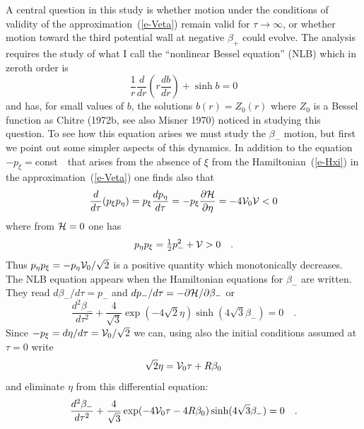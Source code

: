 A central question in this study is whether motion under the
conditions of validity of the approximation~(\ref{e-Veta}) remain
valid for $\tau \rightarrow \infty$, or whether motion toward the
third potential wall at negative $\beta_+$ could evolve.  The
analysis requires the study of what I call the ``nonlinear Bessel
equation'' (NLB) which in zeroth order is
\begin{equation}\label{e-NLB}
   \frac{1}{r}\frac{d}{dr}\left(r\frac{db}{dr}\right) + \sinh b = 0
\end{equation}
and has, for small values of $b$, the solutions $b(r) = Z_0(r)$ where
$Z_0$ is a Bessel function as Chitre (1972b, see also Misner 1970)
noticed in studying this question.  To see how this equation arises
we must study the $\beta_-$ motion, but first we point out some
simpler aspects of this dynamics. In addition to the equation $-p_\xi
= $const\ \  that arises from the absence of $\xi$ from the
Hamiltonian~(\ref{e-Hxi}) in the approximation~(\ref{e-Veta}) one
finds also that
\begin{equation}
   \frac{d}{d\tau}(p_\xi p_\eta) = p_\xi \frac{dp_\eta}{d\tau}
   = - p_\xi \frac{\partial {\cal H}}{\partial\eta}
   = -4{\cal V}_0 {\cal V} < 0
\end{equation}
where from ${\cal H} = 0$ one has
\begin{equation}
   p_\eta p_\xi = \mbox{$\frac{1}{2}$} p_-^2 + {\cal V} > 0 \quad .
\end{equation}
Thus $p_\eta p_\xi = -p_\eta {\cal V}_0/\sqrt{2}$ is a positive
quantity which monotonically decreases.  The NLB equation appears
when the Hamiltonian equations for $\beta_-$ are written.  They read
$d\beta_-/d\tau = p_-$ and $dp_-/d\tau = -\partial {\cal H}/\partial
\beta_-$ or
\begin{equation}
   \frac{d^2\beta_-}{d\tau^2} + \frac{4}{\sqrt{3}}\exp(-4\sqrt{2}\eta)
                                    \sinh(4\sqrt{3}\beta_-) = 0 \quad .
\end{equation}
Since $-p_\xi = d\eta/d\tau = {\cal V}_0 / \sqrt{2}$ we can, using
also the initial conditions assumed at $\tau = 0$ write
\begin{equation}
   \sqrt{2}\eta = {\cal V}_0 \tau + R\beta_0
\end{equation}
and eliminate $\eta$ from this differential equation:
\begin{equation}
   \frac{d^2\beta_-}{d\tau^2}
            + \frac{4}{\sqrt{3}}\exp(-4{\cal V}_0 \tau -4 R\beta_0)
                                \sinh(4\sqrt{3}\beta_-) = 0 \quad .
\end{equation}

